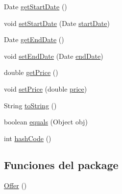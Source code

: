 \begin{DoxyCompactItemize}
\item 
Date \mbox{\hyperlink{classcom_1_1ruralhousejsf_1_1domain_1_1_offer_a41039d86fd455568f6623996b639b7a5}{get\+Start\+Date}} ()
\item 
void \mbox{\hyperlink{classcom_1_1ruralhousejsf_1_1domain_1_1_offer_ad829c57ed6d018c673d4fff942757ed4}{set\+Start\+Date}} (Date \mbox{\hyperlink{classcom_1_1ruralhousejsf_1_1domain_1_1_offer_a3c4e8f6eb72413f6f76b1e4b05404ea8}{start\+Date}})
\item 
Date \mbox{\hyperlink{classcom_1_1ruralhousejsf_1_1domain_1_1_offer_aa6adb6e4f0999247d9426233f62b2185}{get\+End\+Date}} ()
\item 
void \mbox{\hyperlink{classcom_1_1ruralhousejsf_1_1domain_1_1_offer_a4ee5091e976e14c9b34817e1c8225e01}{set\+End\+Date}} (Date \mbox{\hyperlink{classcom_1_1ruralhousejsf_1_1domain_1_1_offer_a315f9b97f02da79a97fa489db212b5ce}{end\+Date}})
\item 
double \mbox{\hyperlink{classcom_1_1ruralhousejsf_1_1domain_1_1_offer_a498e3f0617a7a097d68857ce20e6addd}{get\+Price}} ()
\item 
void \mbox{\hyperlink{classcom_1_1ruralhousejsf_1_1domain_1_1_offer_aaf77b7df1299a14ecc9cae2040dec6af}{set\+Price}} (double \mbox{\hyperlink{classcom_1_1ruralhousejsf_1_1domain_1_1_offer_a2106c38f0c490e3263b1364c3ac56b0a}{price}})
\item 
String \mbox{\hyperlink{classcom_1_1ruralhousejsf_1_1domain_1_1_offer_a91920170708c786730b8707d51d5a810}{to\+String}} ()
\item 
boolean \mbox{\hyperlink{classcom_1_1ruralhousejsf_1_1domain_1_1_offer_aea11cafbf3e7304d38630b80a3f4dc1e}{equals}} (Object obj)
\item 
int \mbox{\hyperlink{classcom_1_1ruralhousejsf_1_1domain_1_1_offer_aad4fd5441e084e41b30bb1d8d3597c48}{hash\+Code}} ()
\end{DoxyCompactItemize}
\subsection*{Funciones del \textquotesingle{}package\textquotesingle{}}
\begin{DoxyCompactItemize}
\item 
\mbox{\hyperlink{classcom_1_1ruralhousejsf_1_1domain_1_1_offer_aa25c14124afd5f3f53c26ef4a564397d}{Offer}} ()
\end{DoxyCompactItemize}
